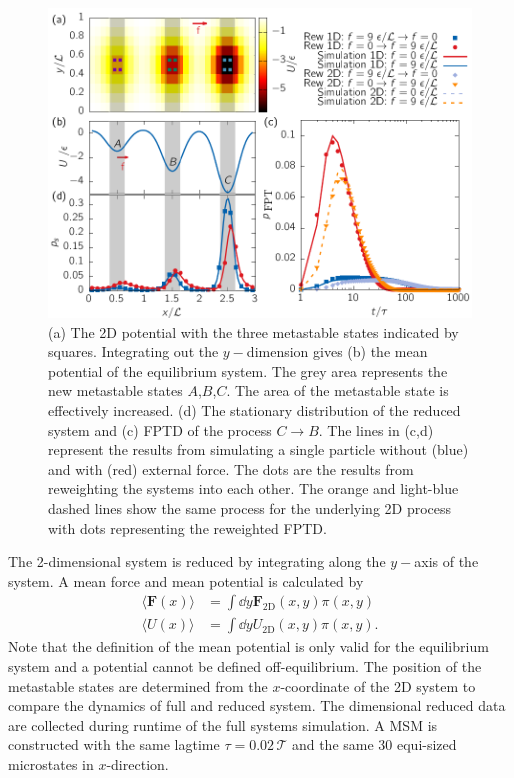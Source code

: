 \begin{figure}
 \centering
 \includegraphics{../plots/Frew/single_1030.pdf}
 \caption[Free energy surface, stationary distribution and first-passage time distribution of a chosen process for the 1D reduced system]{ (a) The 2D potential with the three metastable states indicated by squares. Integrating out the $y-$dimension gives (b) the mean potential of the equilibrium system. The grey area represents the new metastable states $A$,$B$,$C$. The area of the metastable state is effectively increased.  (d) The stationary distribution of the reduced system and (c) FPTD of the process  $C\rightarrow B$. The lines in (c,d) represent the results from simulating a single particle without (blue) and with (red) external force. The dots are the results from reweighting the systems into each other. The orange and light-blue dashed lines show the same process for the underlying 2D process with dots representing the reweighted FPTD.  }
 \label{fig:potred}
\end{figure} 
 
The 2-dimensional system is reduced by integrating along the $y-$axis of the system. A mean force and mean potential is calculated by
\begin{equation}
\begin{aligned}
  \langle \mathbf{F} (x) \rangle &= \int \dd{y} \mathbf{F}_{\text{2D}}(x,y) \pi(x,y) \\
  \langle U (x) \rangle &= \int \dd{y} U_{\text{2D}}(x,y) \pi(x,y) .
\end{aligned}
\end{equation}
Note that the definition of the mean potential is only valid for the equilibrium system and a potential cannot be defined off-equilibrium. The position of the metastable states are determined from the $x$-coordinate of the 2D system to compare the dynamics of full and reduced system. The dimensional reduced data are collected during runtime of the full systems simulation. A MSM is constructed with the same lagtime $\tau=0.02\,\mathcal{T}$ and the same 30 equi-sized microstates in $x$-direction. 

